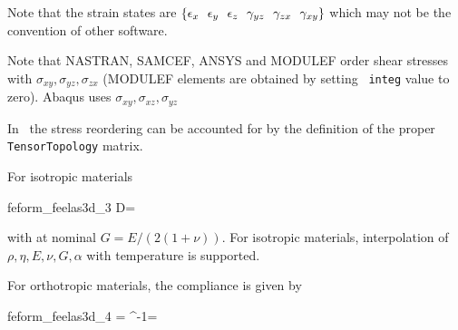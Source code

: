 Note that the strain states are $\ve{\epsilon_x \ \ \epsilon_y \ \ \epsilon_z \ \ \gamma_{yz} \ \ \gamma_{zx} \ \ \gamma_{xy}}$ which may not be the convention of other software. 

Note that NASTRAN, SAMCEF, ANSYS and MODULEF order shear stresses with $\sigma_{xy}, \sigma_{yz}, \sigma_{zx}$ (MODULEF elements are obtained by setting \psolid\ {\tt integ} value to zero).  Abaqus uses $\sigma_{xy}, \sigma_{xz}, \sigma_{yz}$ %

In \festress\ the stress reordering can be accounted for by the definition of the proper {\tt TensorTopology} matrix.

For isotropic materials

\begin{eqsvg}{feform_feelas3d_3}
D=
\end{eqsvg}

with at nominal $G=E/(2(1+\nu))$. For isotropic materials, interpolation of $\rho,\eta,E,\nu,G,\alpha$ with temperature is supported. 

For orthotropic materials, the compliance is given by 

\begin{eqsvg}{feform_feelas3d_4}
\ve{\epsilon} = ^{-1}\ve{\sigma}=
{\tiny {}}
\end{eqsvg}



